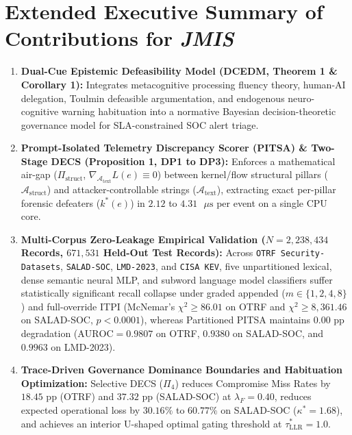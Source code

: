 \documentclass[11pt,a4paper]{article}
\begin{document}
\section*{Extended Executive Summary of Contributions for \textit{JMIS}}
\begin{enumerate}[leftmargin=1.8em, itemsep=6pt]
  \item \textbf{Dual-Cue Epistemic Defeasibility Model (DCEDM, Theorem 1 \& Corollary 1):} Integrates metacognitive processing fluency theory, human-AI delegation, Toulmin defeasible argumentation, and endogenous neuro-cognitive warning habituation into a normative Bayesian decision-theoretic governance model for SLA-constrained SOC alert triage.
  \item \textbf{Prompt-Isolated Telemetry Discrepancy Scorer (PITSA) \& Two-Stage DECS (Proposition 1, DP1 to DP3):} Enforces a mathematical air-gap ($\Pi_{\text{struct}}$, $\nabla_{\mathcal{A}_{\text{text}}} L(e) \equiv 0$) between kernel/flow structural pillars ($\mathcal{A}_{\text{struct}}$) and attacker-controllable strings ($\mathcal{A}_{\text{text}}$), extracting exact per-pillar forensic defeaters ($k^*(e)$) in $2.12$ to $4.31\text{ }\mu\text{s}$ per event on a single CPU core.
  \item \textbf{Multi-Corpus Zero-Leakage Empirical Validation ($N = 2,238,434$ Records, $671,531$ Held-Out Test Records):} Across \texttt{OTRF Security-Datasets}, \texttt{SALAD-SOC}, \texttt{LMD-2023}, and \texttt{CISA KEV}, five unpartitioned lexical, dense semantic neural MLP, and subword language model classifiers suffer statistically significant recall collapse under graded appended ($m \in \{1,2,4,8\}$) and full-override ITPI (McNemar's $\chi^2 \ge 86.01$ on OTRF and $\chi^2 \ge 8,361.46$ on SALAD-SOC, $p < 0.0001$), whereas Partitioned PITSA maintains $0.00\text{ pp}$ degradation ($\text{AUROC} = 0.9807$ on OTRF, $0.9380$ on SALAD-SOC, and $0.9963$ on LMD-2023).
  \item \textbf{Trace-Driven Governance Dominance Boundaries and Habituation Optimization:} Selective DECS ($\Pi_4$) reduces Compromise Miss Rates by $18.45\text{ pp}$ (OTRF) and $37.32\text{ pp}$ (SALAD-SOC) at $\lambda_F = 0.40$, reduces expected operational loss by $30.16\%$ to $60.77\%$ on SALAD-SOC ($\kappa^* = 1.68$), and achieves an interior U-shaped optimal gating threshold at $\tau^*_{\text{LLR}} = 1.0$.
\end{enumerate}
\end{document}
